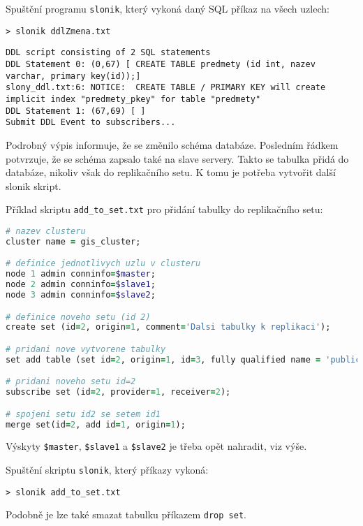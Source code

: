Spuštění programu \texttt{slonik}, který vykoná daný SQL příkaz na všech uzlech:

\begin{lstlisting}
> slonik ddlZmena.txt
\end{lstlisting}
\begin{lstlisting}[identifierstyle=\color{black},stringstyle=\color{black},keywordstyle=\color{black}]
DDL script consisting of 2 SQL statements
DDL Statement 0: (0,67) [ CREATE TABLE predmety (id int, nazev varchar, primary key(id));]
slony_ddl.txt:6: NOTICE:  CREATE TABLE / PRIMARY KEY will create implicit index "predmety_pkey" for table "predmety"
DDL Statement 1: (67,69) [ ]
Submit DDL Event to subscribers...
\end{lstlisting}

Podrobný výpis informuje, že se změnilo schéma databáze. Posledním řádkem
potvrzuje, že se schéma zapsalo také na slave servery. Takto se tabulka přidá do
databáze, nikoliv však do replikačního setu. K tomu je potřeba vytvořit
další slonik skript.

Příklad skriptu \texttt{add\_to\_set.txt} pro přidání tabulky do replikačního
setu:

\begin{lstlisting}[language=ruby]
# nazev clusteru
cluster name = gis_cluster;

# definice jednotlivych uzlu v clusteru
node 1 admin conninfo=$master;
node 2 admin conninfo=$slave1;
node 3 admin conninfo=$slave2;

# definice noveho setu (id 2)
create set (id=2, origin=1, comment='Dalsi tabulky k replikaci');

# pridani nove vytvorene tabulky
set add table (set id=2, origin=1, id=3, fully qualified name = 'public.predmet', comment='seznam predmetu');

# pridani noveho setu id=2
subscribe set (id=2, provider=1, receiver=2);

# spojeni setu id2 se setem id1
merge set(id=2, add id=1, origin=1);
\end{lstlisting}
Výskyty \texttt{\$master}, \texttt{\$slave1} a \texttt{\$slave2} je třeba opět
nahradit, viz výše.

Spuštění skriptu \texttt{slonik}, který příkazy vykoná:

\begin{lstlisting}
> slonik add_to_set.txt
\end{lstlisting}

Podobně je lze také smazat tabulku příkazem \texttt{drop set}.
